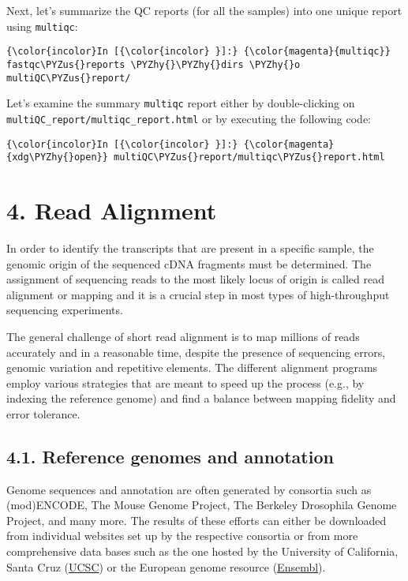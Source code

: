 \documentclass[11pt]{article}
\def\PYZus{\char`\_}
\def\PYZhy{\char`\-}
\begin{document}
    Next, let's summarize the QC reports (for all the samples) into one
unique report using \texttt{multiqc}:

    \begin{Verbatim}[commandchars=\\\{\}]
{\color{incolor}In [{\color{incolor} }]:} {\color{magenta}{multiqc}} fastqc\PYZus{}reports \PYZhy{}\PYZhy{}dirs \PYZhy{}o multiQC\PYZus{}report/
\end{Verbatim}

    Let's examine the summary \texttt{multiqc} report either by
double-clicking on \texttt{multiQC\_report/multiqc\_report.html} or by
executing the following code:

    \begin{Verbatim}[commandchars=\\\{\}]
{\color{incolor}In [{\color{incolor} }]:} {\color{magenta}{xdg\PYZhy{}open}} multiQC\PYZus{}report/multiqc\PYZus{}report.html
\end{Verbatim}

    

    \hypertarget{read-alignment}{%
\section*{4. Read Alignment}\label{read-alignment}}

    In order to identify the transcripts that are present in a specific
sample, the genomic origin of the sequenced cDNA fragments must be
determined. The assignment of sequencing reads to the most likely locus
of origin is called read alignment or mapping and it is a crucial step
in most types of high-throughput sequencing experiments.

The general challenge of short read alignment is to map millions of
reads accurately and in a reasonable time, despite the presence of
sequencing errors, genomic variation and repetitive elements. The
different alignment programs employ various strategies that are meant to
speed up the process (e.g., by indexing the reference genome) and find a
balance between mapping fidelity and error tolerance.

    \hypertarget{reference-genomes-and-annotation}{%
\subsection*{4.1. Reference genomes and
annotation}\label{reference-genomes-and-annotation}}

    Genome sequences and annotation are often generated by consortia such as
(mod)ENCODE, The Mouse Genome Project, The Berkeley Drosophila Genome
Project, and many more. The results of these efforts can either be
downloaded from individual websites set up by the respective consortia
or from more comprehensive data bases such as the one hosted by the
University of California, Santa Cruz (\href{https://genome.ucsc.edu/}{UCSC}) or the European genome
resource (\href{http://www.ensembl.org/}{Ensembl}).
\end{document}
